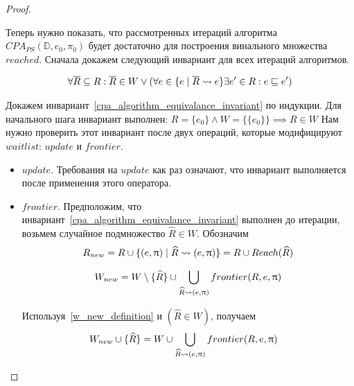 \begin{proof}
\begin{enumerate}
Теперь нужно показать, что рассмотренных итераций алгоритма $CPA_{PS}(\mathbb{D}, e_0, \pi_0)$ будет достаточно для построения винального множества $reached$.
Сначала докажем следующий инвариант для всех итераций алгоритмов.

\begin{equation}
\label{cpa_algorithm_equivalance_invariant}
\begin{aligned}
\forall \overline{R} \subseteq R: \overline{R} \in W \lor (\forall e \in \{e \mid \overline{R} \leadsto e\} \exists e' \in R : e \sqsubseteq e') 
\end{aligned}
\end{equation}

Докажем инвариант~\ref{cpa_algorithm_equivalance_invariant} по индукции.
Для начального шага инвариант выполнен: $R = \{e_0\} \land W = \{\{e_0\}\} \implies R \in W$
Нам нужно проверить этот инвариант после двух операций, которые модифицируют $waitlist$: $update$ и $frontier$.

\begin{itemize}
\item $update$. Требования на $update$ как раз означают, что инвариант выполняется после применения этого оператора.

\item $frontier$. Предположим, что инвариант~\ref{cpa_algorithm_equivalance_invariant} выполнен до итерации, возьмем случайное подмножество $\widehat{R} \in W$. 
Обозначим
\begin{equation}
\label{r_new_definition}
\begin{aligned}
R_{new} = R \cup \{(e, \uppi) \mid \widehat{R} \leadsto (e, \uppi)\} = R \cup Reach(\widehat{R})
\end{aligned}
\end{equation}

\begin{equation}
\label{w_new_definition}
\begin{aligned}
W_{new} = W \setminus \{\widehat{R}\} \cup \bigcup_{\widehat{R} \leadsto (e, \uppi)}{frontier(R, e, \uppi)}
\end{aligned}
\end{equation}

Используя~\ref{w_new_definition} и $(\widehat{R} \in W)$, получаем
\begin{equation}
\label{w_new_equation}
\begin{aligned}
& W_{new} \cup \{\widehat{R}\} = W \cup \bigcup_{\widehat{R} \leadsto (e, \uppi)}{frontier(R, e, \uppi)} 
\end{aligned}
\end{equation}


\end{itemize}
\end{enumerate}
\end{proof}
